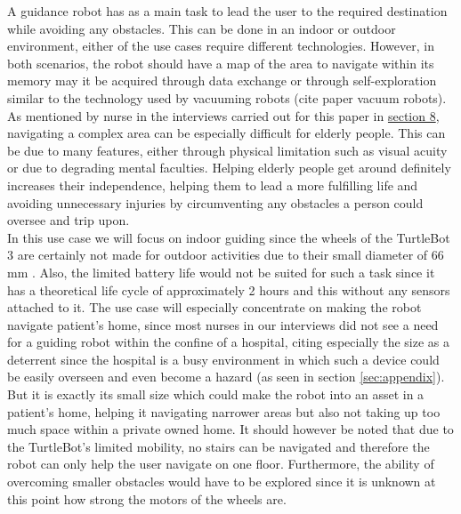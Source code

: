 \documentclass[plainarticle,zihtitle,english,final,hyperref,utf8]{zihpub}
\begin{document}
A guidance robot has as a main task to lead the user to the required destination while avoiding any obstacles. This can be done in an indoor or outdoor environment, either of the use cases require different technologies. However, in both scenarios, the robot should have a map of the area to navigate within its memory may it be acquired through data exchange or through self-exploration similar to the technology used by vacuuming robots (cite paper vacuum robots).\\
\newline
As mentioned by nurse in the interviews carried out for this paper in \href{sec:appendix}{section 8}, navigating a complex area can be especially difficult for elderly people. This can be due to many features, either through physical limitation such as visual acuity or due to degrading mental faculties. Helping elderly people get around definitely increases their independence, helping them to lead a more fulfilling life and avoiding unnecessary injuries by circumventing any obstacles a person could oversee and trip upon.\\
\newline
In this use case we will focus on indoor guiding since the wheels of the TurtleBot 3 are certainly not made for outdoor activities due to their small diameter of 66 mm \cite{tbspecificiations}. Also, the limited battery life would not be suited for such a task since it has a theoretical life cycle of approximately 2 hours \cite{tbspecificiations} and this without any sensors attached to it. The use case will especially concentrate on making the robot navigate patient’s home, since most nurses in our interviews did not see a need for a guiding robot within the confine of a hospital, citing especially the size as a deterrent since the hospital is a busy environment in which such a device could be easily overseen and even become a hazard (as seen in section  \ref{sec:appendix}). \\
\newline
But it is exactly its small size which could make the robot into an asset in a patient’s home, helping it navigating narrower areas but also not taking up too much space within a private owned home. It should however be noted that due to the TurtleBot’s limited mobility, no stairs can be navigated and therefore the robot can only help the user navigate on one floor. Furthermore, the ability of overcoming smaller obstacles would have to be explored since it is unknown at this point how strong the motors of the wheels are.
\end{document}
